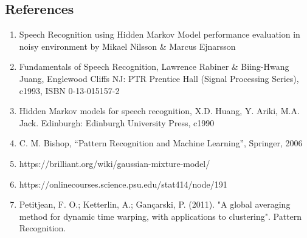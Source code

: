 \documentclass[12pt, a4paper, twoside]{report}
\begin{document}
\subsection*{References}
\begin{enumerate}[label=(\arabic*), noitemsep]
\item Speech Recognition using Hidden Markov Model performance evaluation in noisy environment by Mikael Nilsson \& Marcus Ejnarsson
\item Fundamentals of Speech Recognition, Lawrence Rabiner \& Biing-Hwang Juang, Englewood Cliffs NJ: PTR Prentice Hall (Signal Processing Series), c1993, ISBN 0-13-015157-2
\item Hidden Markov models for speech recognition, X.D. Huang, Y. Ariki, M.A. Jack. Edinburgh: Edinburgh University Press, c1990
\item C. M. Bishop, ``Pattern Recognition and Machine Learning'', Springer, 2006
\item https://brilliant.org/wiki/gaussian-mixture-model/
\item https://onlinecourses.science.psu.edu/stat414/node/191
\item Petitjean, F. O.; Ketterlin, A.; Gançarski, P. (2011). "A global averaging method for dynamic time warping, with applications to clustering". Pattern Recognition.
\end{enumerate}
\end{document}
